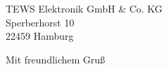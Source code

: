 \documentclass[ebner,paper=a4,fontsize=11pt,ngerman,BCOR=10mm]{scrlttr2}%
\begin{document}
\begin{letter}{TEWS Elektronik GmbH \& Co. KG\\
Sperberhorst 10\\
22459 Hamburg}
% 
% 
% 
% 
% 
% 
% 

\closing{Mit freundlichem Gru\ss}
\enlargethispage{6\baselineskip}

\end{letter}
\end{document}
